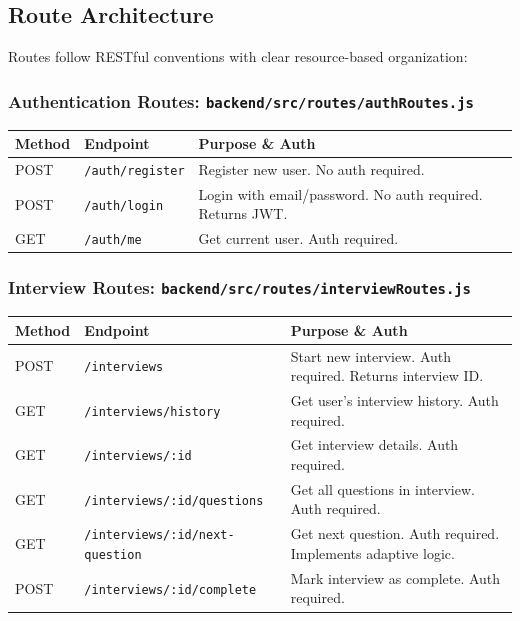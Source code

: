 \documentclass[12pt,a4paper,oneside]{article}
\newcommand{\fileref}[1]{\texttt{#1}}
\begin{document}
\subsection{Route Architecture}

Routes follow RESTful conventions with clear resource-based organization:

\subsubsection{Authentication Routes: \fileref{backend/src/routes/authRoutes.js}}

\begin{table}[H]
\centering
\begin{tabular}{|p{1.5cm}|p{2cm}|p{11cm}|}
\hline
\textbf{Method} & \textbf{Endpoint} & \textbf{Purpose \& Auth} \\
\hline
POST & \texttt{/auth/register} & Register new user. No auth required. \\
\hline
POST & \texttt{/auth/login} & Login with email/password. No auth required. Returns JWT. \\
\hline
GET & \texttt{/auth/me} & Get current user. Auth required. \\
\hline
\end{tabular}
\end{table}

\subsubsection{Interview Routes: \fileref{backend/src/routes/interviewRoutes.js}}

\begin{table}[H]
\centering
\begin{tabular}{|p{1.5cm}|p{3cm}|p{10cm}|}
\hline
\textbf{Method} & \textbf{Endpoint} & \textbf{Purpose \& Auth} \\
\hline
POST & \texttt{/interviews} & Start new interview. Auth required. Returns interview ID. \\
\hline
GET & \texttt{/interviews/history} & Get user's interview history. Auth required. \\
\hline
GET & \texttt{/interviews/:id} & Get interview details. Auth required. \\
\hline
GET & \texttt{/interviews/:id/questions} & Get all questions in interview. Auth required. \\
\hline
GET & \texttt{/interviews/:id/next-question} & Get next question. Auth required. Implements adaptive logic. \\
\hline
POST & \texttt{/interviews/:id/complete} & Mark interview as complete. Auth required. \\
\hline
\end{tabular}
\end{table}
\end{document}
